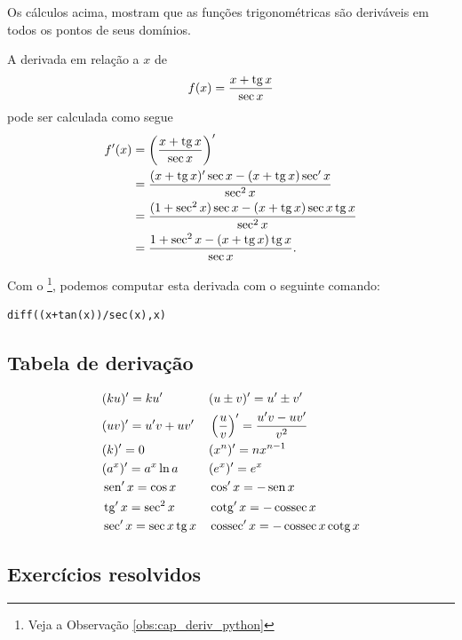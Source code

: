 \begin{obs}
  Os cálculos acima, mostram que as funções trigonométricas são deriváveis em todos os pontos de seus domínios.
\end{obs}

\begin{ex}
  A derivada em relação a $x$ de
  \begin{equation}
    f(x) = \frac{x + \operatorname{tg} x}{\sec x}
  \end{equation}
  pode ser calculada como segue
  \begin{align}
    f'(x) &= \left(\frac{x+\operatorname{tg} x}{\sec x}\right)' \\
          &= \frac{(x+\operatorname{tg} x)'\sec x - (x+\operatorname{tg} x)\sec' x}{\sec^2 x} \\
          &= \frac{(1+\sec^2 x)\sec x - (x+\operatorname{tg} x)\sec x\operatorname{tg} x}{\sec^2 x} \\
          &= \frac{1+\sec^2 x - (x+\operatorname{tg} x)\operatorname{tg} x}{\sec x}.
  \end{align}

  \ifispython
  Com o \sympy\footnote{Veja a Observação \ref{obs:cap_deriv_python}}, podemos computar esta derivada com o seguinte comando:
\begin{verbatim}
diff((x+tan(x))/sec(x),x)
\end{verbatim}
  \fi
\end{ex}

\subsection{Tabela de derivação}

\begin{align*}
  & (ku)' = ku' && (u\pm v)' = u' \pm v'\\
  & (uv)' = u'v + uv' && \left(\frac{u}{v}\right)' = \frac{u'v - uv'}{v^2} \\
  & (k)' = 0 && (x^n)' = nx^{n-1}\\
  & (a^x)' = a^x\ln a && (e^x)' = e^x \\
  & \operatorname{sen}' x = \cos x && \cos' x = - \operatorname{sen} x\\
  & \operatorname{tg}' x = \sec^2 x && \operatorname{cotg}' x = -\operatorname{cossec} x \\
  & \sec' x = \sec x \operatorname{tg} x && \operatorname{cossec}' x = -\operatorname{cossec} x\operatorname{cotg} x
\end{align*}

\subsection*{Exercícios resolvidos}

